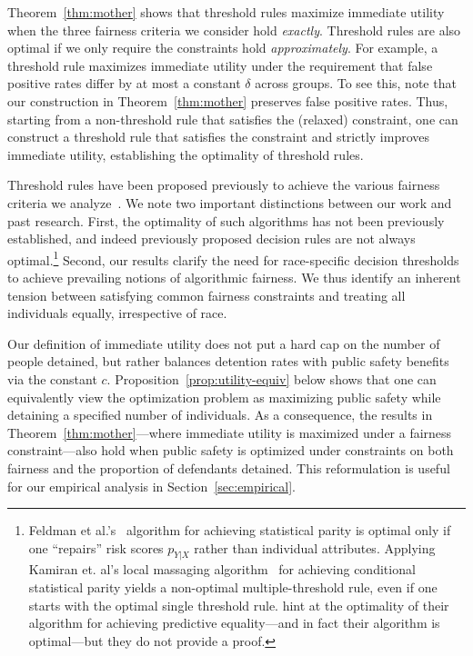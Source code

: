 \documentclass[sigconf]{acmart}
\begin{document}
Theorem~\ref{thm:mother} shows that threshold rules maximize immediate utility when the three fairness criteria we consider hold \emph{exactly}.
Threshold rules are also optimal if we only require the constraints hold \emph{approximately}.
For example, a threshold rule maximizes immediate utility under the requirement that false positive rates differ by at most a constant $\delta$ across groups.
To see this, note that our construction in Theorem~\ref{thm:mother} preserves false positive rates. Thus, starting from a non-threshold rule that satisfies the (relaxed) constraint, one can construct a threshold rule that satisfies the constraint and strictly improves immediate utility, establishing the optimality of threshold rules.

Threshold rules have been proposed previously
to achieve the various fairness criteria we analyze~\cite{feldman2015,kamiran2013,hardt2016}.
We note two important distinctions between our work and past research.
First, the optimality of such algorithms has not been previously established, 
and indeed previously proposed decision rules are not always optimal.\footnote{%
Feldman et al.'s~\cite{feldman2015} algorithm for achieving statistical parity is optimal only if one ``repairs'' risk scores $p_{Y|X}$ rather than individual attributes.
Applying Kamiran et. al's local massaging algorithm~\cite{kamiran2013} for achieving conditional statistical parity yields a non-optimal multiple-threshold rule, even if one starts with the optimal single threshold rule.
\citet{hardt2016} hint at the optimality of their algorithm for achieving predictive equality---and in fact their algorithm is optimal---but they do not provide a proof.
}
Second, our results clarify the need for race-specific decision 
thresholds to achieve prevailing notions of algorithmic fairness.
We thus identify an inherent tension between satisfying common
fairness constraints and treating all individuals equally, irrespective of race.

Our definition of immediate utility does not put a hard cap on the number of people detained, 
but rather balances detention rates with public safety benefits via the constant $c$.
Proposition~\ref{prop:utility-equiv} below shows that one can equivalently view the optimization
problem as maximizing public safety while detaining a specified number of individuals.
As a consequence, the results in Theorem~\ref{thm:mother}---where immediate utility is maximized under a fairness constraint---also hold when public safety is optimized under constraints on both fairness and the proportion of defendants detained.
This reformulation is useful for our empirical analysis in Section~\ref{sec:empirical}.
\end{document}
